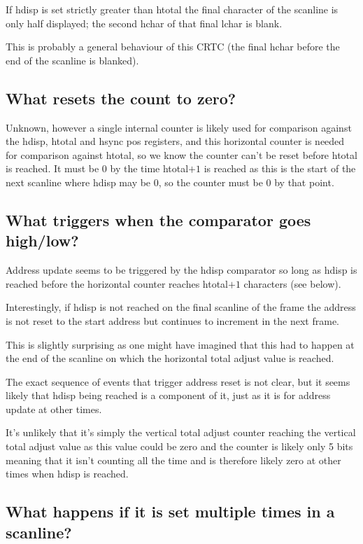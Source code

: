 \documentclass[a4paper,10pt]{amsart}
\begin{document}
If hdisp is set strictly greater than htotal the final character of the
scanline is only half displayed; the second hchar of that final lchar is blank.

This is probably a general behaviour of this CRTC (the final hchar before
the end of the scanline is blanked).

\subsection{What resets the count to zero?}

Unknown, however a single internal counter is likely used for comparison
against the hdisp, htotal and hsync pos registers, and this horizontal counter
is needed for comparison against htotal, so we know the counter can't be reset
before htotal is reached. It must be 0 by the time htotal$+1$ is reached as
this is the start of the next scanline where hdisp may be $0$, so the counter
must be $0$ by that point.

\subsection{What triggers when the comparator goes high/low?}

Address update seems to be triggered by the hdisp comparator so long as hdisp
is reached before the horizontal counter reaches htotal$+1$ characters (see
below).

Interestingly, if hdisp is not reached on the final scanline of the frame
the address is not reset to the start address but continues to increment in the
next frame.

This is slightly surprising as one might have imagined that this had to happen
at the end of the scanline on which the horizontal total adjust value is
reached.

The exact sequence of events that trigger address reset is not clear, but it
seems likely that hdisp being reached is a component of it, just as it is for
address update at other times.

It's unlikely that it's simply the vertical total adjust counter reaching
the vertical total adjust value as this value could be zero and the counter is
likely only 5 bits meaning that it isn't counting all the time and is therefore
likely zero at other times when hdisp is reached.

\subsection{What happens if it is set multiple times in a scanline?}
\end{document}
